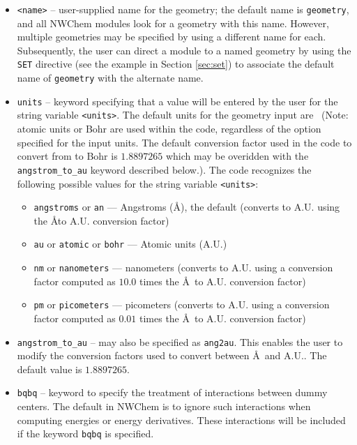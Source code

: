 \begin{itemize}
\item \verb+<name>+ -- user-supplied name for the geometry; the
  default name is \verb+geometry+, and all NWChem modules look for a
  geometry with this name.  However, multiple geometries may
  be specified by using a different name for each.  Subsequently,
  the user can direct a module to a named geometry by
  using the \verb+SET+ directive (see
  the example in Section \ref{sec:set}) to associate the default
  name of \verb+geometry+ with the alternate name.

\item \verb+units+ -- keyword specifying that a value will be entered
  by the user for the string variable \verb+<units>+.  The default
  units for the geometry input are \angstroms\ (Note: atomic units or
  Bohr are used within the code, regardless of the option specified
  for the input units.  The default conversion factor used in the code
  to convert from {\angstroms} to Bohr is $1.8897265$ which may be
  overidden with the \verb+angstrom_to_au+ keyword described below.).  The code
  recognizes the following possible values for the string variable
  \verb+<units>+:
\begin{itemize}
\item \verb+angstroms+ or \verb+an+ --- Angstroms (\AA), the default
  (converts to A.U. using the \AA to A.U. conversion factor)
\item \verb+au+ or \verb+atomic+ or \verb+bohr+ --- Atomic units (A.U.)
\item \verb+nm+ or \verb+nanometers+ --- nanometers (converts to
  A.U. using a conversion factor computed as $10.0$ times the
  \AA\ to A.U. conversion factor) 
\item \verb+pm+ or \verb+picometers+ --- picometers (converts to 
  A.U. using a conversion factor computed as $0.01$ times the 
  \AA\ to A.U. conversion factor)
\end{itemize}

\item \verb+angstrom_to_au+ -- may also be specified as
  \verb+ang2au+.  This enables the user to modify the conversion
  factors used to convert between \AA\ and A.U..  The default value is
  $1.8897265$. 
      
\item \verb+bqbq+ -- keyword to specify the treatment of interactions
  between dummy centers.  The default in NWChem is to ignore such
  interactions when computing energies or energy derivatives.  These
  interactions will be included if the keyword \verb+bqbq+ is
  specified.


\end{itemize}
